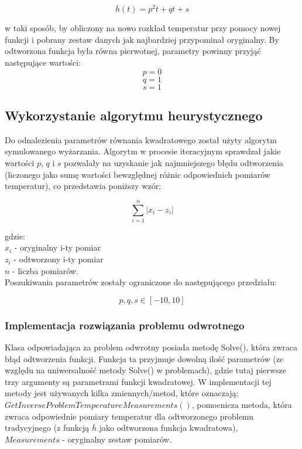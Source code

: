 \documentclass[twoside]{projektInzynierskiMS1}
\newcommand{\si}{ś}
\begin{document}
\[\overline{h}(t) = p^2 t + qt + s \]

w taki sposób, by obliczony na nowo rozkład temperatur przy pomocy nowej funkcji i pobrany zestaw danych jak najbardziej przypominał oryginalny. By odtworzona funkcja była równa pierwotnej, parametry powinny przyjąć następujące warto\si ci:
\[ p = 0\]
\[ q = 1\]
\[ s = 1\]

\subsection{Wykorzystanie algorytmu heurystycznego}
Do odnalezienia parametrów równania kwadratowego został użyty algorytm symulowanego wyżarzania. Algorytm w procesie iteracyjnym sprawdzał jakie warto\si ci $p$, $q$ i $s$ pozwalały na uzyskanie jak najmniejszego błędu odtworzenia (liczonego jako sumę warto\si ci bewzględnej różnic odpowiednich pomiarów temperatur), co przedstawia poniższy wzór:

$$ \sum_{i=1}^{n} \left| x_i - z_i \right| $$

gdzie: \\
$ x_i $ - oryginalny i-ty pomiar  \\
$ z_i$  - odtworzony i-ty pomiar  \\
$ n $ - liczba pomiarów. \\

Poszukiwania parametrów zostały ograniczone do następującego przedziału:

\[ p, q, s \in [-10, 10] \]

\subsubsection{Implementacja rozwiązania problemu odwrotnego}

Klasa odpowiadająca za problem odwrotny posiada metodę Solve(), która zwraca błąd odtworzenia funkcji. Funkcja ta przyjmuje dowolną ilo\si ć parametrów (ze względu na uniwersalno\si ć metody Solve() w problemach), gdzie tutaj pierwsze trzy argumenty są parametrami funkcji kwadratowej. W implementacji tej metody jest używanych kilka zmiennych/metod, które oznaczają:\\

\noindent $GetInverseProblemTemperatureMeasurements()$, pomocnicza metoda, która zwraca odpowiednie pomiary temperatur dla odtworzonego problemu tradycyjnego (z funkcją $\overline{h}$ jako odtworzona funkcja kwadratowa), \\
\noindent $Measurements$ - oryginalny zestaw pomiarów. \\
\end{document}
